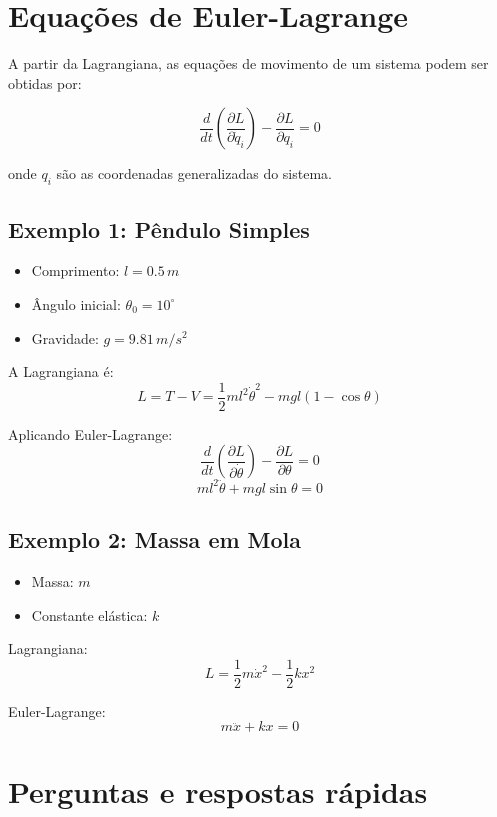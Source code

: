 \documentclass[12pt,a4paper]{article}
\begin{document}
\section{Equações de Euler-Lagrange}

A partir da Lagrangiana, as equações de movimento de um sistema podem ser obtidas por:

\begin{equation}
\frac{d}{dt}\left(\frac{\partial L}{\partial \dot{q}_i}\right) - \frac{\partial L}{\partial q_i} = 0
\end{equation}

onde \(q_i\) são as coordenadas generalizadas do sistema.

\subsection{Exemplo 1: Pêndulo Simples}

\begin{itemize}
    \item Comprimento: $l = 0.5 \, m$
    \item Ângulo inicial: $\theta_0 = 10^\circ$
    \item Gravidade: $g = 9.81 \, m/s^2$
\end{itemize}

A Lagrangiana é:
\[
L = T - V = \frac{1}{2} m l^2 \dot{\theta}^2 - m g l (1 - \cos\theta)
\]

Aplicando Euler-Lagrange:
\[
\frac{d}{dt} \left(\frac{\partial L}{\partial \dot{\theta}}\right) - \frac{\partial L}{\partial \theta} = 0
\]
\[
m l^2 \ddot{\theta} + m g l \sin\theta = 0
\]

\subsection{Exemplo 2: Massa em Mola}

\begin{itemize}
    \item Massa: $m$
    \item Constante elástica: $k$
\end{itemize}

Lagrangiana:
\[
L = \frac{1}{2} m \dot{x}^2 - \frac{1}{2} k x^2
\]

Euler-Lagrange:
\[
m \ddot{x} + k x = 0
\]

\section{Perguntas e respostas rápidas}
\end{document}
